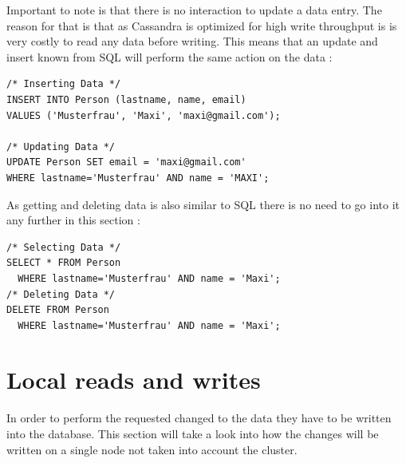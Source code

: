 Important to note is that there is no interaction to update a data entry. The reason for that is that as Cassandra is optimized for high write throughput is is very costly to read any data before writing. This means that an update and insert known from SQL will perform the same action on the data \autocite{cqlAlexMeng, newInCQL3}:
\begin{verbatim}
/* Inserting Data */
INSERT INTO Person (lastname, name, email)
VALUES ('Musterfrau', 'Maxi', 'maxi@gmail.com');

/* Updating Data */
UPDATE Person SET email = 'maxi@gmail.com'
WHERE lastname='Musterfrau' AND name = 'MAXI';
\end{verbatim}

As getting and deleting data is also similar to SQL there is no need to go into it any further in this section \autocite{cqlAlexMeng, cassandra3cqldocSelect}:
\begin{verbatim}
/* Selecting Data */
SELECT * FROM Person
  WHERE lastname='Musterfrau' AND name = 'Maxi';
/* Deleting Data */
DELETE FROM Person
  WHERE lastname='Musterfrau' AND name = 'Maxi';
\end{verbatim}

\section{Local reads and writes}
In order to perform the requested changed to the data they have to be written into the database. This section will take a look into how the changes will be written on a single node not taken into account the cluster.

